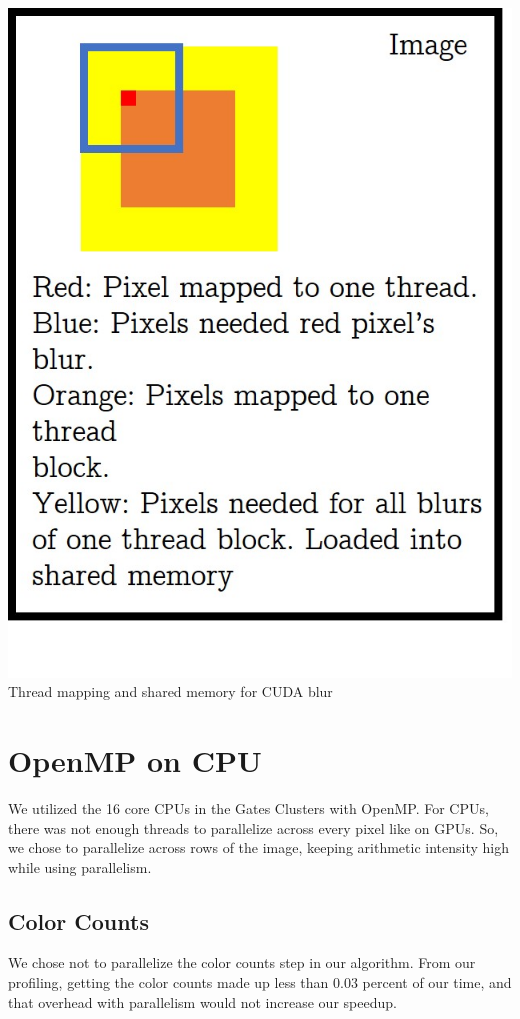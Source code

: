 \documentclass[12pt]{article}
\begin{document}
\begin{center}
\includegraphics[scale=0.3]{mapping.jpg} \\
Thread mapping and shared memory for CUDA blur
\end{center}

\section{OpenMP on CPU}
We utilized the 16 core CPUs in the Gates Clusters with OpenMP. For CPUs,
there was not enough threads to parallelize across every pixel like on GPUs.
So, we chose to parallelize across rows of the image, keeping arithmetic
intensity high while using parallelism.

\subsection{Color Counts}
We chose not to parallelize the color counts step in our algorithm. From our
profiling, getting the color counts made up less than 0.03 percent of our
time, and that overhead with parallelism would not increase our speedup.
\end{document}
